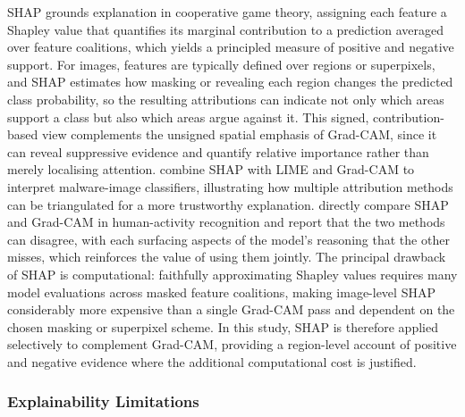 SHAP \citep{lundberg2017shap} grounds explanation in cooperative game theory, assigning each feature a Shapley value that quantifies its marginal contribution to a prediction averaged over feature coalitions, which yields a principled measure of positive and negative support.
For images, features are typically defined over regions or superpixels, and SHAP estimates how masking or revealing each region changes the predicted class probability, so the resulting attributions can indicate not only which areas support a class but also which areas argue against it.
This signed, contribution-based view complements the unsigned spatial emphasis of Grad-CAM, since it can reveal suppressive evidence and quantify relative importance rather than merely localising attention.
\citet{nazim2025malware} combine SHAP with LIME and Grad-CAM to interpret malware-image classifiers, illustrating how multiple attribution methods can be triangulated for a more trustworthy explanation.
\citet{tempel2024shapgradcam} directly compare SHAP and Grad-CAM in human-activity recognition and report that the two methods can disagree, with each surfacing aspects of the model's reasoning that the other misses, which reinforces the value of using them jointly.
The principal drawback of SHAP is computational: faithfully approximating Shapley values requires many model evaluations across masked feature coalitions, making image-level SHAP considerably more expensive than a single Grad-CAM pass and dependent on the chosen masking or superpixel scheme.
In this study, SHAP is therefore applied selectively to complement Grad-CAM, providing a region-level account of positive and negative evidence where the additional computational cost is justified.

\subsubsection{Explainability Limitations}
\label{subsubsec:xailimits}

